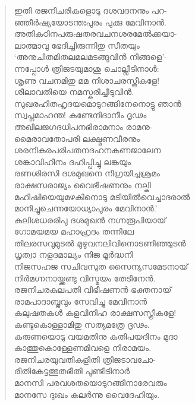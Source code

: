 \begin{verse}
ഇതി രജനിചരികളൊടു ദശവദനനും പറ-\\
ഞ്ഞീര്‍ഷ്യയോടന്തഃപുരം പുക്കു മേവിനാന്‍.\\
അതികഠിനപരുഷതരവചനശരമേല്‍ക്കയാ-\\
ലാത്മാവു ഭേദിച്ചിരുന്നിതു സീതയും\\
‘അനുചിതമിതലമലമടങ്ങുവിന്‍ നിങ്ങളെ’-\\
ന്നപ്പോള്‍ ത്രിജടയുമാശു ചൊല്ലീടിനാള്‍:\\
ശൃണു വചനമിതു മമ നിശാചരസ്ത്രീകളേ!\\
ശീലാവതിയെ നമസ്കരിച്ചീടുവിന്‍.\\
സുഖരഹിതഹൃദയമൊടുറങ്ങിനേനൊട്ടു ഞാന്‍\\
സ്വപ്നമാഹന്ത! കണ്ടേനിദാനീം ദൃഢം\\
അഖിലജഗദധിപനഭിരാമനാം രാമനു-\\
മൈരാവതോപരി ലക്ഷ്മണവീരനും\\
ശരനികരപരിപതനദഹനകണജാലേന\\
ശങ്കാവിഹീനം ദഹിപ്പിച്ചു ലങ്കയും\\
രണശിരസി ദശമുഖനെ നിഗ്രയിച്ചശ്രമം\\
രാക്ഷസരാജ്യം വൈഭീഷണനും നല്കി\\
മഹിഷിയെയുമഴകിനൊടു മടിയില്‍വെച്ചാദരാല്‍\\
മാനിച്ചുചെന്നയോധ്യാപുരം മേവിനാന്‍.’\\
കുലിശധരരിപു ദശമുഖന്‍ നഗ്നരൂപിയായ്\\
ഗോമയമയ മഹാഹ്രദം തന്നിലേ\\
തിലരസവുമുടല്‍ മുഴുവനലിവിനൊടണിഞ്ഞുടന്‍\\
ധൃത്വാ നളദമാല്യം നിജ മൂര്‍ദ്ധനി\\
നിജസഹജ സചിവസുത സൈന്യസമേടനായ്\\
നിര്‍മഗ്നനായ്ക്കണ്ടു വിസ്മയം തേടിനേന്‍.\\
രജനിചരകുലപതി വിഭീഷണന്‍ ഭക്തനായ്\\
രാമപാദാബ്ജവും സേവിച്ചു മേവിനാന്‍\\
കലുഷതകള്‍ കളവിനിഹ രാക്ഷസസ്ത്രീകളേ!\\
കണ്ടുകൊള്ളാമിതു സത്യമത്രേ ദൃഢം.\\
കരുണയൊടു വയമതിനു കതിപയദിനം മുദാ\\
കാത്തുകൊള്ളേണമിവളെ നിരാമയം.\\
രജനിചരയുവതികളിതി ത്രിജടാവചോ-\\
രീതികേട്ടത്ഭുതഭീതി പൂണ്ടീടിനാര്‍\\
മാനസി പരവശതയൊടുറങ്ങിനാരേവരും\\
മാനസേ ദുഃഖം കലര്‍ന്നു വൈദേഹിയും.
\end{verse}


